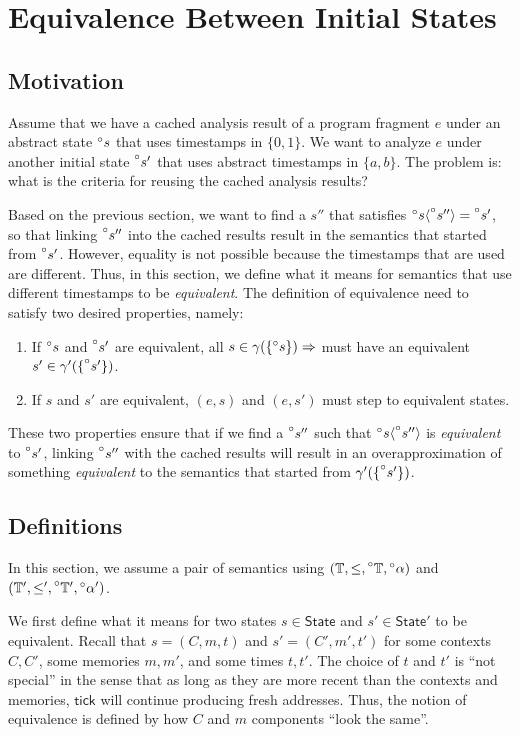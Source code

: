 \documentclass[acmsmall,review]{acmart}\settopmatter{printfolios=true,printccs=false,printacmref=false}
\theoremstyle{definition}
\theoremstyle{plain}
\newcommand*{\A}[1]{\prescript{\circ}{}{#1}}
\newcommand*{\Time}{\mathbb{T}}
\newcommand*{\ATime}{\A{\Time}}
\newcommand*{\mem}{m}
\newcommand*{\State}{\mathsf{State}}
\newcommand*{\tick}{\mathsf{tick}}
\newcommand*{\inject}[2]{{#2}\langle{#1}\rangle}
\begin{document}
\section{Equivalence Between Initial States}
\subsection{Motivation}
Assume that we have a cached analysis result of a program fragment $e$ under an abstract state $\A{s}$ that uses timestamps in $\{0,1\}$.
We want to analyze $e$ under another initial state $\A{s'}$ that uses abstract timestamps in $\{a,b\}$.
The problem is: what is the criteria for reusing the cached analysis results?

Based on the previous section, we want to find a $s''$ that satisfies $\inject{\A{s''}}{\A{s}}=\A{s'}$, so that linking $\A{s''}$ into the cached results result in the semantics that started from $\A{s'}$.
However, equality is not possible because the timestamps that are used are different.
Thus, in this section, we define what it means for semantics that use different timestamps to be \emph{equivalent}.
The definition of equivalence need to satisfy two desired properties, namely:
\begin{enumerate}
  \item If $\A{s}$ and $\A{s'}$ are equivalent, all $s\in\gamma(\{\A{s}\})\Rightarrow$ must have an equivalent $s'\in\gamma'(\{\A{s'}\})$.
  \item If $s$ and $s'$ are equivalent, $(e,s)$ and $(e,s')$ must step to equivalent states.
\end{enumerate}
These two properties ensure that if we find a $\A{s''}$ such that $\inject{\A{s''}}{\A{s}}$ is \emph{equivalent} to $\A{s'}$, linking $\A{s''}$ with the cached results will result in an overapproximation of something \emph{equivalent} to the semantics that started from $\gamma'(\{\A{s'}\})$.

\subsection{Definitions}
In this section, we assume a pair of semantics using $(\Time,\le,\ATime,\A\alpha)$ and $(\Time',\le',\ATime',\A\alpha')$.

We first define what it means for two states $s\in\State$ and $s'\in\State'$ to be equivalent.
Recall that $s=(C,\mem,t)$ and $s'=(C',\mem',t')$ for some contexts $C,C'$, some memories $\mem,\mem'$, and some times $t,t'$.
The choice of $t$ and $t'$ is ``not special'' in the sense that as long as they are more recent than the contexts and memories, $\tick$ will continue producing fresh addresses.
Thus, the notion of equivalence is defined by how $C$ and $\mem$ components ``look the same''.
\end{document}
